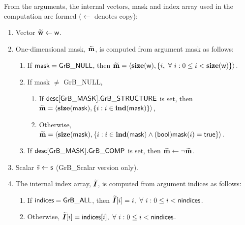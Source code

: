 From the arguments, the internal vectors, mask and index array used in 
the computation are formed ($\leftarrow$ denotes copy):
\begin{enumerate}
	\item Vector ${\bf \widetilde{w}} \leftarrow {\sf w}$.

	\item One-dimensional mask, ${\bf \widetilde{m}}$, is computed from 
    argument {\sf mask} as follows:
	\begin{enumerate}
		\item If ${\sf mask} = {\sf GrB\_NULL}$, then ${\bf \widetilde{m}} = 
        \langle \bold{size}({\sf w}), \{i, \ \forall \ i : 0 \leq i < 
        \bold{size}({\sf w}) \} \rangle$.

		\item If {\sf mask} $\ne$ {\sf GrB\_NULL},  
        \begin{enumerate}
            \item If ${\sf desc[GrB\_MASK].GrB\_STRUCTURE}$ is set, then
            ${\bf \widetilde{m}} = 
            \langle \bold{size}({\sf mask}), \{i : i \in \bold{ind}({\sf mask}) \} \rangle$,
            \item Otherwise, ${\bf \widetilde{m}} = 
            \langle \bold{size}({\sf mask}), \{i : i \in \bold{ind}({\sf mask}) \wedge
            ({\sf bool}){\sf mask}(i) = {\sf true} \} \rangle$.
        \end{enumerate}

		\item	If ${\sf desc[GrB\_MASK].GrB\_COMP}$ is set, then 
        ${\bf \widetilde{m}} \leftarrow \neg {\bf \widetilde{m}}$.
	\end{enumerate}

    \item Scalar ${\tilde{s}} \leftarrow {\sf s}$ ({\sf GrB\_Scalar} version only).

    \item The internal index array, $\bm{\widetilde{I}}$, is computed from 
    argument {\sf indices} as follows:
	\begin{enumerate}
		\item	If ${\sf indices} = {\sf GrB\_ALL}$, then 
        $\bm{\widetilde{I}}[i] = i, \ \forall \ i : 0 \leq i < {\sf nindices}$.

		\item	Otherwise, $\bm{\widetilde{I}}[i] = {\sf indices}[i], 
        \ \forall \ i : 0 \leq i < {\sf nindices}$.
    \end{enumerate}
\end{enumerate}

